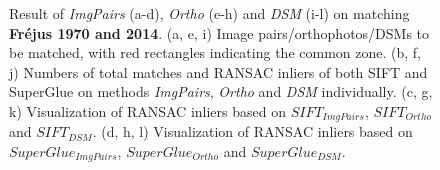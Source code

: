\begin{figure}[htbp]
\begin{center}
{\begin{minipage}[t]{0.48\linewidth}
            \end{minipage}%
        }
        \caption{{\scriptsize Result of \textit{ImgPairs} (a-d), \textit{Ortho} (e-h) and \textit{DSM} (i-l) on matching \textbf{Fr{\'e}jus 1970 and 2014}. (a, e, i) Image pairs/orthophotos/DSMs to be matched, with red rectangles indicating the common zone. (b, f, j) Numbers of total matches and RANSAC inliers of both SIFT and SuperGlue on methods \textit{ImgPairs}, \textit{Ortho} and \textit{DSM} individually. (c, g, k) Visualization of RANSAC inliers based on $SIFT_{ImgPairs}$, $SIFT_{Ortho}$ and $SIFT_{DSM}$. (d, h, l) Visualization of RANSAC inliers based on $SuperGlue_{ImgPairs}$, $SuperGlue_{Ortho}$ and $SuperGlue_{DSM}$.}}
        \label{MatchVizFrejus1970DSM}
    \end{center}
\end{figure} 


